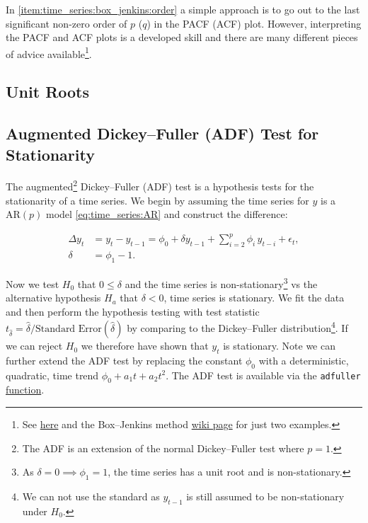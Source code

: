 In \cref{item:time_series:box_jenkins:order} a simple approach is to
go out to the last significant non-zero order of $p$ ($q$) in the PACF (ACF) plot.
However, interpreting the PACF and ACF plots is a developed skill
and there are many different pieces of advice
available\footnote{See
\href{https://people.duke.edu/~rnau/411arim3.htm}{here}
and the Box--Jenkins method
\href{https://en.wikipedia.org/wiki/Box\%E2\%80\%93Jenkins\_method\#Autocorrelation\_and\_partial\_autocorrelation\_plots}{wiki page}
for just two examples.}.

\subsection{Unit Roots}
\label{additional:time_series:unit_root}


\subsection{Augmented Dickey--Fuller (ADF) Test for Stationarity}
\label{additional:time_series:ADF}

The augmented\footnote{The ADF is an extension of the normal Dickey--Fuller test where $p = 1$.} Dickey--Fuller (ADF) test
is a hypothesis tests for the stationarity of a time series.
We begin by assuming the time series for $y$ is a $\text{AR}\left(p\right)$ model \cref{eq:time_series:AR}
and construct the difference:

\begin{subequations}\label{eq:time_series:ADF}
\begin{align}
\Delta y_{t} &= y_{t} - y_{t-1} = \phi_{0} + \delta y_{t-1} + \sum_{i=2}^{p} \phi_{i}\, y_{t-i} + \epsilon_{t}, \label{eq:time_series:ADF:Delta_y} \\
\delta &= \phi_{1} - 1. \label{eq:time_series:ADF:delta}
\end{align}
\end{subequations}

Now we test $H_{0}$ that $0 \leq \delta$ and the time series is
non-stationary\footnote{As $\delta = 0 \implies \phi_{1} = 1$, \ie the time series has a unit root and is non-stationary.}
vs the alternative hypothesis $H_{a}$ that $\delta < 0$, \ie time series is stationary.
We fit the data and then perform the hypothesis testing with test statistic
$t_{\hat{\delta}} = \hat{\delta} / \text{Standard Error}\left(\hat{\delta}\right)$
by comparing to the Dickey--Fuller distribution\footnote{We can not use the standard \tdist as $y_{t-1}$ is still assumed to be non-stationary under $H_{0}$.}.
If we can reject $H_{0}$ we therefore have shown that $y_{t}$ is stationary.
Note we can further extend the ADF test by replacing the constant $\phi_{0}$
with a deterministic, quadratic, time trend $\phi_{0} + a_{1} t + a_{2} t^{2}$.
The ADF test is available via the \texttt{adfuller}
\href{https://www.statsmodels.org/stable/generated/statsmodels.tsa.stattools.adfuller.html}{function}.

